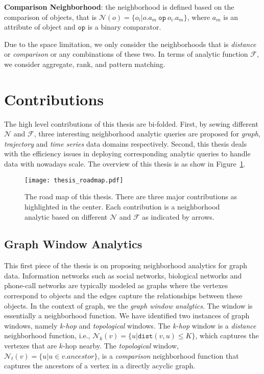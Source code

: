 \textbf{Comparison Neighborhood}: the neighborhood is defined based on the comparison of objects, that is $\mathcal{N}(o) = \{o_i | o.a_m \ \mathtt{op} \ o_i.a_m\}$, where $a_m$ is an attribute of object
and $\mathtt{op}$ is a binary comparator.

Due to the space limitation, we only consider the neighborhoods that is \emph{distance} or \emph{comparison} or any combinations of these two. In terms of analytic function $\mathcal{F}$, we consider aggregate, rank, and pattern matching.

\section{Contributions}
The high level contributions of this thesis are bi-folded. First, by
sewing different $\mathcal{N}$ and $\mathcal{F}$, three interesting
neighborhood analytic queries are proposed for \emph{graph}, \emph{trajectory}
and \emph{time series} data domains respectively. Second, this thesis
deals with the efficiency issues in deploying corresponding analytic queries to
handle data with nowadays scale.
The overview of this thesis is as show in Figure~\ref{fig:thesis_roadmap}.
\begin{figure}[h]
\centering
\texttt{[image: thesis\_roadmap.pdf]}
\caption{The road map of this thesis. There are three major contributions as highlighted in the center. Each contribution
is a neighborhood analytic based on different $\mathcal{N}$ and $\mathcal{F}$ as indicated by arrows.} 
\label{fig:thesis_roadmap}
\end{figure}

\subsection{Graph Window Analytics}
This first piece of the thesis is on proposing neighborhood analytics
for graph data. Information networks such as social networks, biological networks
and phone-call networks are typically modeled as graphs where the 
vertexes correspond to objects and the edges capture the
relationships between these objects. 
In the context of graph, we 
the \emph{graph window analytics}. The window is essentially 
a neighborhood function. We have identified 
two instances of graph windows, namely
\emph{k-hop} and \emph{topological} windows. 
The \emph{k-hop} window is a \emph{distance} neighborhood function, i.e., $\mathcal{N}_k(v)= \{u|\mathtt{dist}(v,u) \leq K\}$, which captures the vertexes that are $k$-hop nearby. 
The \emph{topological} window,  $\mathcal{N}_t(v)= \{u | u \in v.ancestor\}$,
is a \emph{comparison} neighborhood function that captures
the ancestors of a vertex in a directly acyclic graph. 


